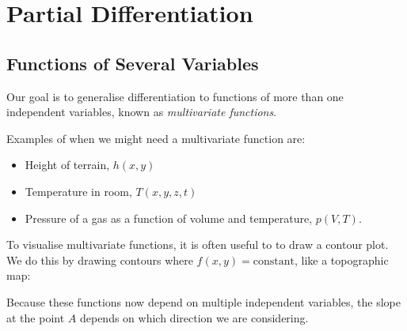 \documentclass[../main.tex]{subfiles}
\begin{document}
\chapter{Partial Differentiation}
\section{Functions of Several Variables}
Our goal is to generalise differentiation to functions of more than one independent variables, known as \textit{multivariate functions}.
\begin{example}
  Examples of when we might need a multivariate function are:
  \begin{itemize}
    \item Height of terrain, $h(x, y)$
    \item Temperature in room, $T(x, y, z, t)$
    \item Pressure of a gas as a function of volume and temperature, $p(V, T)$.
  \end{itemize}
\end{example}
To visualise multivariate functions, it is often useful to to draw a contour plot.
We do this by drawing contours where $f(x, y) = \text{constant}$, like a topographic map:
\begin{center}
\end{center}
Because these functions now depend on multiple independent variables, the slope at the point $A$ depends on which direction we are considering.
\end{document}
